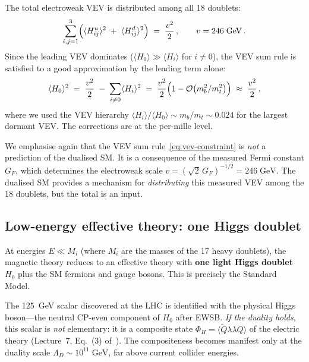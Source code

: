 \documentclass[11pt,a4paper]{article}
\begin{document}
The total electroweak VEV is distributed among all 18 doublets:
\begin{equation}\label{eq:vev-constraint}
  \sum_{i,j=1}^{3}
  \Bigl(
    \langle H_{ij}^u \rangle^2
    \;+\; \langle H_{ij}^d \rangle^2
  \Bigr)
  \;=\; \frac{v^2}{2}\,,
  \qquad v = 246\;\text{GeV}\,.
\end{equation}
Since the leading VEV dominates ($\langle H_0 \rangle \gg \langle H_i
\rangle$ for $i \neq 0$), the VEV sum rule is satisfied to a good
approximation by the leading term alone:
\begin{equation}\label{eq:vev-dominance}
  \langle H_0 \rangle^2 \;=\; \frac{v^2}{2}
  \;-\; \sum_{i \neq 0} \langle H_i \rangle^2
  \;=\; \frac{v^2}{2}
  \Bigl(1 - \mathcal{O}\bigl(m_b^2/m_t^2\bigr)\Bigr)
  \;\approx\; \frac{v^2}{2}\,,
\end{equation}
where we used the VEV hierarchy
$\langle H_i \rangle / \langle H_0 \rangle \sim m_b/m_t \sim 0.024$ for
the largest dormant VEV.  The corrections are at the per-mille level.

\begin{remark}
  We emphasise again that the VEV sum rule~\eqref{eq:vev-constraint}
  is \emph{not} a prediction of the dualised SM.  It is a consequence
  of the measured Fermi constant $G_F$, which determines the
  electroweak scale $v = (\sqrt{2}\, G_F)^{-1/2} = 246\;\text{GeV}$.
  The dualised SM provides a mechanism for \emph{distributing} this
  measured VEV among the 18 doublets, but the total is an input.
\end{remark}

\subsection{Low-energy effective theory: one Higgs doublet}

At energies $E \ll M_i$ (where $M_i$ are the masses of the 17 heavy
doublets), the magnetic theory reduces to an effective theory with
\textbf{one light Higgs doublet} $H_0$ plus the SM fermions and gauge
bosons.  This is precisely the Standard Model.

The 125~GeV scalar discovered at the LHC is identified with the
physical Higgs boson---the neutral CP-even component of $H_0$ after
EWSB.  \emph{If the duality holds}, this scalar is \emph{not}
elementary: it is a composite state
$\Phi_H = \langle \widetilde{Q}\lambda\lambda Q \rangle$ of the
electric theory (Lecture~7, Eq.~(3) of~\cite{CacciapagliaSannino2024}).
The compositeness becomes manifest only at the
duality scale $\Lambda_D \sim 10^{11}\;\text{GeV}$, far above current
collider energies.
\end{document}
